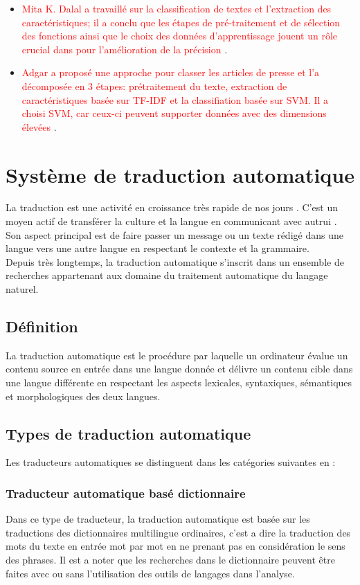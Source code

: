 \begin{itemize}
     \item  \textcolor{red}{Mita K. Dalal a travaillé sur la classification de textes et l'extraction des caractéristiques; il a conclu que les étapes de pré-traitement et de sélection des fonctions ainsi que le choix des données d'apprentissage jouent un rôle crucial dans pour l'amélioration de la précision \cite{itemetat7}}. 
     
     \item  \textcolor{red}{Adgar a proposé une approche pour classer les articles de presse et l'a décomposée en 3 étapes: prétraitement du texte, extraction de caractéristiques basée sur TF-IDF et la classifiation basée sur SVM.
     Il a choisi SVM, car ceux-ci peuvent supporter données avec des dimensions élevées \cite{itemetat8}}.
     
     \end{itemize}
     	

\section{Système de traduction automatique}
La traduction est une activité en croissance très rapide de nos jours \cite{tradstat}. C'est un moyen actif de transférer la culture et la langue en communicant avec autrui \cite{tradcom}. Son aspect principal est de faire passer un message ou un texte rédigé dans une langue vers une autre langue en respectant le contexte et la grammaire.\\
Depuis très longtemps, la traduction automatique s'inscrit dans un ensemble de recherches appartenant aux domaine du traitement automatique du langage naturel.
    \subsection{Définition}
    La traduction automatique est le procédure par laquelle un ordinateur évalue un contenu source en entrée dans une langue donnée et délivre un contenu cible dans une langue différente en respectant les aspects lexicales, syntaxiques, sémantiques et morphologiques des deux langues.
    \subsection{Types de traduction automatique}
    Les traducteurs automatiques se distinguent dans les catégories suivantes en :
        \subsubsection{Traducteur automatique basé dictionnaire}
        Dans ce type de traducteur, la traduction automatique est basée sur les traductions des dictionnaires multilingue ordinaires, c'est a dire la traduction des mots du texte en entrée mot par mot en ne prenant pas en considération le sens des phrases. Il est a noter que les recherches dans le dictionnaire peuvent être faites avec ou sans l'utilisation des outils de langages dans l'analyse.
